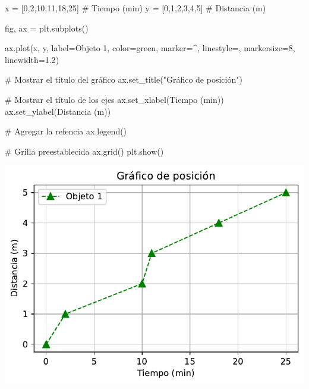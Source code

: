 \documentclass[
  letterpaper,
  DIV=11,
  numbers=noendperiod]{scrreprt}
\newenvironment{Shaded}{\begin{snugshade}}{\end{snugshade}}
\newcommand{\CommentTok}[1]{\textcolor[rgb]{0.37,0.37,0.37}{#1}}
\newcommand{\DecValTok}[1]{\textcolor[rgb]{0.68,0.00,0.00}{#1}}
\newcommand{\FloatTok}[1]{\textcolor[rgb]{0.68,0.00,0.00}{#1}}
\newcommand{\NormalTok}[1]{\textcolor[rgb]{0.00,0.23,0.31}{#1}}
\newcommand{\OperatorTok}[1]{\textcolor[rgb]{0.37,0.37,0.37}{#1}}
\newcommand{\StringTok}[1]{\textcolor[rgb]{0.13,0.47,0.30}{#1}}
\begin{document}
\begin{Shaded}
\begin{Highlighting}[]
\NormalTok{x }\OperatorTok{=}\NormalTok{ [}\DecValTok{0}\NormalTok{,}\DecValTok{2}\NormalTok{,}\DecValTok{10}\NormalTok{,}\DecValTok{11}\NormalTok{,}\DecValTok{18}\NormalTok{,}\DecValTok{25}\NormalTok{]   }\CommentTok{\# Tiempo (min)}
\NormalTok{y }\OperatorTok{=}\NormalTok{ [}\DecValTok{0}\NormalTok{,}\DecValTok{1}\NormalTok{,}\DecValTok{2}\NormalTok{,}\DecValTok{3}\NormalTok{,}\DecValTok{4}\NormalTok{,}\DecValTok{5}\NormalTok{]       }\CommentTok{\# Distancia (m)}

\NormalTok{fig, ax }\OperatorTok{=}\NormalTok{ plt.subplots()}

\NormalTok{ax.plot(x, y, label}\OperatorTok{=}\StringTok{\textquotesingle{}Objeto 1\textquotesingle{}}\NormalTok{, color}\OperatorTok{=}\StringTok{\textquotesingle{}green\textquotesingle{}}\NormalTok{, marker}\OperatorTok{=}\StringTok{\textquotesingle{}\^{}\textquotesingle{}}\NormalTok{, linestyle}\OperatorTok{=}\StringTok{\textquotesingle{}{-}{-}\textquotesingle{}}\NormalTok{, markersize}\OperatorTok{=}\DecValTok{8}\NormalTok{, linewidth}\OperatorTok{=}\FloatTok{1.2}\NormalTok{)}

\CommentTok{\# Mostrar el título del gráfico}
\NormalTok{ax.set\_title(}\StringTok{"Gráfico de posición"}\NormalTok{)}

\CommentTok{\# Mostrar el título de los ejes}
\NormalTok{ax.set\_xlabel(}\StringTok{\textquotesingle{}Tiempo (min)\textquotesingle{}}\NormalTok{)}
\NormalTok{ax.set\_ylabel(}\StringTok{\textquotesingle{}Distancia (m)\textquotesingle{}}\NormalTok{)}

\CommentTok{\# Agregar la refencia}
\NormalTok{ax.legend()}

\CommentTok{\# Grilla preestablecida}
\NormalTok{ax.grid()}
\NormalTok{plt.show()}
\end{Highlighting}
\end{Shaded}

\includegraphics{unidad_6_files/figure-pdf/cell-115-output-1.pdf}
\end{document}
